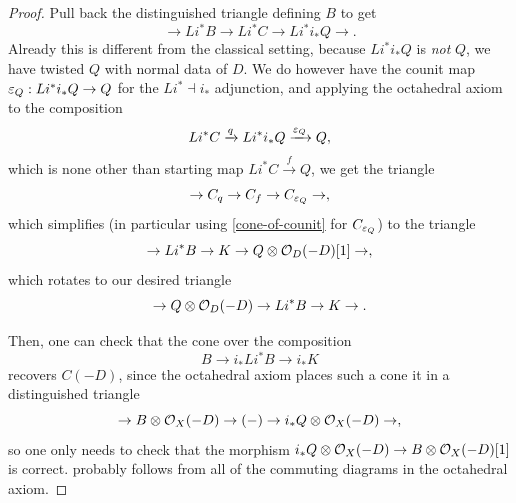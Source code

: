 \documentclass[12pt]{article}
\newcommand{\cTor}{\mathcal{T}\hspace{-0.2em}or}
\begin{document}
\begin{proof}
    Pull back the distinguished triangle defining $B$ to get
    \[\to Li^* B \to Li^* C \to Li^* i_* Q \to.\]
    Already this is different from the classical setting, because $Li^* i_* Q$ is \textit{not} $Q$, we have twisted $Q$ with normal data of $D$. We do however have the counit map $\varepsilon_Q: Li^* i_* Q\to Q$ for the $Li^* \dashv i_*$ adjunction, and applying the octahedral axiom to the composition
    \[Li^*C \xrightarrow{q} Li^*i_* Q \xrightarrow{\varepsilon_Q} Q,\]
    which is none other than starting map $Li^*C \xrightarrow{f} Q$, we get the triangle
    \[\to C_q \to C_f \to C_{\varepsilon_Q}\to,\]
    which simplifies (in particular using \ref{cone-of-counit} for $C_{\varepsilon_Q}$) to the triangle
    \[\to Li^* B \to K \to Q\otimes \mathcal{O}_D(-D)[1]\to,\]
    which rotates to our desired triangle
    \[\to Q\otimes \mathcal{O}_D(-D) \to Li^*B \to K \to.\]

    Then, one can check that the cone over the composition
    \[B\to i_*Li^* B \to i_*K\]
    recovers $C(-D)$, since the octahedral axiom places such a cone it in a distinguished triangle
    \[\to B\otimes \mathcal{O}_X(-D) \to (-) \to i_* Q\otimes \mathcal{O}_X(-D)\to,\]
    so one only needs to check that the morphism $i_* Q\otimes\mathcal{O}_X(-D) \to B\otimes \mathcal{O}_X(-D)[1]$ is correct. {\color{red} probably follows from all of the commuting diagrams in the octahedral axiom}.
    





\end{proof}
\end{document}
